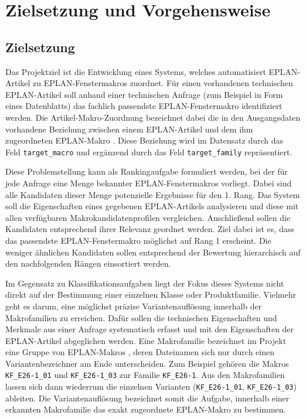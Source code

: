 \chapter{Zielsetzung und Vorgehensweise} 

\section{Zielsetzung}

Das Projektziel ist die Entwicklung eines Systems, welches automatisiert EPLAN-Artikel \parencite{EPLANArtikelverwaltung} zu EPLAN-Fenstermakros \parencite{EPLAN-Makros} zuordnet.
Für einen vorhandenen technischen EPLAN-Artikel \parencite{EPLANArtikelverwaltung} soll anhand einer technischen Anfrage (zum Beispiel in Form eines Datenblatts) das fachlich passendste EPLAN-Fenstermakro \parencite{EPLAN-Makros} identifiziert werden.
Die Artikel-Makro-Zuordnung bezeichnet dabei die in den Ausgangsdaten vorhandene Beziehung zwischen einem EPLAN-Artikel \parencite{EPLANArtikelverwaltung} und dem ihm zugeordneten EPLAN-Makro \parencite{EPLAN-Makros}. Diese Beziehung wird im Datensatz durch das Feld \texttt{target\_macro} und ergänzend durch das Feld \texttt{target\_family} repräsentiert. 


Diese Problemstellung kann als Rankingaufgabe formuliert werden, bei der für jede Anfrage eine Menge bekannter EPLAN-Fenstermakros \parencite{EPLAN-Makros} vorliegt. Dabei sind alle Kandidaten dieser Menge potenzielle Ergebnisse für den 1. Rang.
Das System soll die Eigenschaften eines gegebenen EPLAN-Artikels \parencite{EPLANArtikelverwaltung} analysieren und diese mit allen verfügbaren Makrokandidatenprofilen vergleichen. Anschließend sollen die Kandidaten entsprechend ihrer Relevanz geordnet werden.
Ziel dabei ist es, dass das passendste EPLAN-Fenstermakro \parencite{EPLAN-Makros} möglichst auf Rang 1 erscheint. Die weniger ähnlichen Kandidaten sollen entsprechend der Bewertung hierarchisch auf den nachfolgenden Rängen einsortiert werden.


Im Gegensatz zu Klassifikationsaufgaben liegt der Fokus dieses Systems nicht direkt auf der Bestimmung einer einzelnen Klasse oder Produktfamilie. Vielmehr geht es darum, eine möglichst präzise Variantenauflösung innerhalb der Makrofamilien zu erreichen.
Dafür sollen die technischen Eigenschaften und Merkmale aus einer Anfrage systematisch erfasst und mit den Eigenschaften der EPLAN-Artikel \parencite{EPLANArtikelverwaltung} abgeglichen werden.
Eine Makrofamilie bezeichnet im Projekt eine Gruppe von EPLAN-Makros \parencite{EPLAN-Makros}, deren Dateinamen sich nur durch einen Variantenbezeichner am Ende unterscheiden. Zum Beispiel gehören die Makros \texttt{KF\_E26-1\_01} und \texttt{KF\_E26-1\_03} zur Familie \texttt{KF\_E26-1}.
Aus den Makrofamilien lassen sich dann wiederrum die einzelnen Varianten (\texttt{KF\_E26-1\_01}, \texttt{KF\_E26-1\_03}) ableiten. Die Variantenauflösung bezeichnet somit die Aufgabe, innerhalb einer erkannten Makrofamilie das exakt zugeordnete EPLAN-Makro \parencite{EPLAN-Makros} zu bestimmen.


